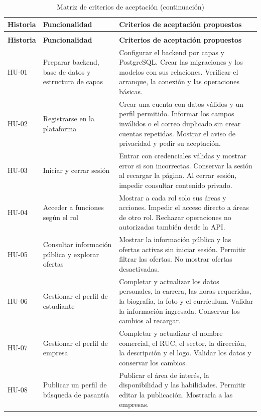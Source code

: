 \begin{longtable}{@{}>{\raggedright\arraybackslash}p{2.2cm}>{\raggedright\arraybackslash}p{4.5cm}>{\raggedright\arraybackslash}p{9.3cm}@{}}
	\caption{Matriz de criterios de aceptación}\label{tab:matriz-criterios-aceptacion}\\
	\hline
	\textbf{Historia} & \textbf{Funcionalidad} & \textbf{Criterios de aceptación propuestos} \\
	\hline
	\endfirsthead
	\caption[]{Matriz de criterios de aceptación (continuación)}\\
	\hline
	\textbf{Historia} & \textbf{Funcionalidad} & \textbf{Criterios de aceptación propuestos} \\
	\hline
	\endhead
	\hline
	\endlastfoot
	HU-01 & Preparar backend, base de datos y estructura de capas & Configurar el backend por capas y PostgreSQL. Crear las migraciones y los modelos con sus relaciones. Verificar el arranque, la conexión y las operaciones básicas. \\
	\hline
	HU-02 & Registrarse en la plataforma & Crear una cuenta con datos válidos y un perfil permitido. Informar los campos inválidos o el correo duplicado sin crear cuentas repetidas. Mostrar el aviso de privacidad y pedir su aceptación. \\
	\hline
	HU-03 & Iniciar y cerrar sesión & Entrar con credenciales válidas y mostrar error si son incorrectas. Conservar la sesión al recargar la página. Al cerrar sesión, impedir consultar contenido privado. \\
	\hline
	HU-04 & Acceder a funciones según el rol & Mostrar a cada rol solo sus áreas y acciones. Impedir el acceso directo a áreas de otro rol. Rechazar operaciones no autorizadas también desde la API. \\
	\hline
	HU-05 & Consultar información pública y explorar ofertas & Mostrar la información pública y las ofertas activas sin iniciar sesión. Permitir filtrar las ofertas. No mostrar ofertas desactivadas. \\
	\hline
	HU-06 & Gestionar el perfil de estudiante & Completar y actualizar los datos personales, la carrera, las horas requeridas, la biografía, la foto y el currículum. Validar la información ingresada. Conservar los cambios al recargar. \\
	\hline
	HU-07 & Gestionar el perfil de empresa & Completar y actualizar el nombre comercial, el RUC, el sector, la dirección, la descripción y el logo. Validar los datos y conservar los cambios. \\
	\hline
	HU-08 & Publicar un perfil de búsqueda de pasantía & Publicar el área de interés, la disponibilidad y las habilidades. Permitir editar la publicación. Mostrarla a las empresas. \\

\end{longtable}
